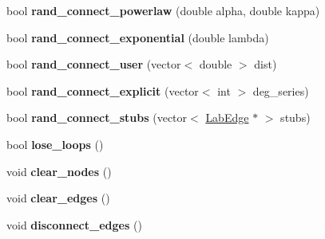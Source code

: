 \begin{DoxyCompactItemize}
\item 
\hypertarget{classelps_1_1_lab_network_a6168c96080fdb3b376157a9cb1ff156e}{bool {\bfseries rand\+\_\+connect\+\_\+powerlaw} (double alpha, double kappa)}\label{classelps_1_1_lab_network_a6168c96080fdb3b376157a9cb1ff156e}

\item 
\hypertarget{classelps_1_1_lab_network_a156f6d27be41ca95c805342978165d24}{bool {\bfseries rand\+\_\+connect\+\_\+exponential} (double lambda)}\label{classelps_1_1_lab_network_a156f6d27be41ca95c805342978165d24}

\item 
\hypertarget{classelps_1_1_lab_network_a3a2eeb8efd39f25f981f4532ed2f943a}{bool {\bfseries rand\+\_\+connect\+\_\+user} (vector$<$ double $>$ dist)}\label{classelps_1_1_lab_network_a3a2eeb8efd39f25f981f4532ed2f943a}

\item 
\hypertarget{classelps_1_1_lab_network_ae2f73cfeae43f03b1496a5008510ab4c}{bool {\bfseries rand\+\_\+connect\+\_\+explicit} (vector$<$ int $>$ deg\+\_\+series)}\label{classelps_1_1_lab_network_ae2f73cfeae43f03b1496a5008510ab4c}

\item 
\hypertarget{classelps_1_1_lab_network_a440f5b1ea29d8d532acfb14287decaf7}{bool {\bfseries rand\+\_\+connect\+\_\+stubs} (vector$<$ \hyperlink{classelps_1_1_lab_edge}{Lab\+Edge} $\ast$ $>$ stubs)}\label{classelps_1_1_lab_network_a440f5b1ea29d8d532acfb14287decaf7}

\item 
\hypertarget{classelps_1_1_lab_network_a97a0bcbac94133e1dc26fd31daa635e5}{bool {\bfseries lose\+\_\+loops} ()}\label{classelps_1_1_lab_network_a97a0bcbac94133e1dc26fd31daa635e5}

\item 
\hypertarget{classelps_1_1_lab_network_a8515c29f4800ca575199d9bc1e94d098}{void {\bfseries clear\+\_\+nodes} ()}\label{classelps_1_1_lab_network_a8515c29f4800ca575199d9bc1e94d098}

\item 
\hypertarget{classelps_1_1_lab_network_a2d93d3e030da4c1dc729c55e5ec0ca6d}{void {\bfseries clear\+\_\+edges} ()}\label{classelps_1_1_lab_network_a2d93d3e030da4c1dc729c55e5ec0ca6d}

\item 
\hypertarget{classelps_1_1_lab_network_a83c1ebe216cba0a45e873ddbe6ea69be}{void {\bfseries disconnect\+\_\+edges} ()}\label{classelps_1_1_lab_network_a83c1ebe216cba0a45e873ddbe6ea69be}


\end{DoxyCompactItemize}
